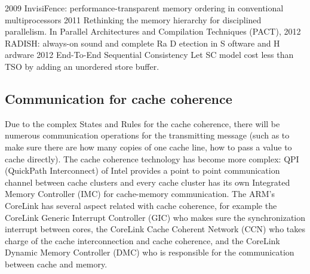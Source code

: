 2009\cite{blundell2009invisifence}
InvisiFence: performance-transparent memory ordering in conventional multiprocessors	
2011\cite{choi2011denovo}
Rethinking the memory hierarchy for disciplined parallelism. In Parallel Architectures and Compilation Techniques (PACT),	
2012\cite{devietti2012radish}
RADISH: always-on sound and complete Ra D etection in S oftware and H ardware	
2012\cite{singh2013end}
End-To-End Sequential Consistency	Let SC model cost less than TSO by adding an unordered store buffer.

\subsection{Communication for cache coherence}
Due to the complex States and Rules for the cache coherence, there will be numerous communication operations for the transmitting message (such as to make sure there are how many copies of one cache line, how to pass a value to cache directly). The cache coherence technology has become more complex: 
QPI (QuickPath Interconnect) of Intel provides a point to point communication channel between cache clusters and every cache cluster has its own Integrated Memory Controller (IMC) for cache-memory communication\cite{intel2009quickpath}.
The ARM's CoreLink\cite{ARMCoreLinkInterconnect} has several aspect related with cache coherence, for example the CoreLink Generic Interrupt Controller (GIC)\cite{ARMCoreLinkGIC} who makes sure the synchronization interrupt between cores, the CoreLink Cache Coherent Network (CCN)\cite{ARMCoreLinkCCN}  who takes charge of the cache interconnection and cache coherence, and the CoreLink Dynamic Memory Controller (DMC) \cite{ARMCoreLinkMC} who is responsible for the communication between cache and memory. 
